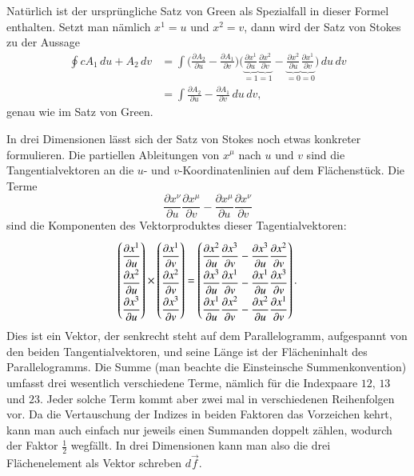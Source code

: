 Natürlich ist der ursprüngliche Satz von Green als Spezialfall in dieser
Formel enthalten.
Setzt man nämlich $x^1=u$ und $x^2=v$, dann wird der Satz von Stokes zu
der Aussage
\begin{align*}
\oint c A_1\,du + A_2\,dv
&=
\int
\biggl(
\frac{\partial A_2}{\partial u}-\frac{\partial A_1}{\partial v}
\biggr)
\biggl(
\underbrace{\frac{\partial x^1}{\partial u}}_{=1}
\underbrace{\frac{\partial x^2}{\partial v}}_{=1}
-
\underbrace{\frac{\partial x^2}{\partial u}}_{=0}
\underbrace{\frac{\partial x^1}{\partial v}}_{=0}
\biggr)
\,du\,dv
\\
&=
\int
\frac{\partial A_2}{\partial u}-\frac{\partial A_1}{\partial v}
\,du\,dv,
\end{align*}
genau wie im Satz von Green.

In drei Dimensionen lässt sich der Satz von Stokes noch etwas konkreter
formulieren.
Die partiellen Ableitungen von $x^\mu$ nach $u$ und $v$ sind die 
Tangentialvektoren an die $u$- und $v$-Koordinatenlinien auf dem 
Flächenstück.
Die Terme
\[
\frac{\partial x^\nu}{\partial u} \frac{\partial x^\mu}{\partial v}
-
\frac{\partial x^\mu}{\partial u} \frac{\partial x^\nu}{\partial v}
\]
sind die Komponenten des Vektorproduktes dieser Tagentialvektoren:
\[
\def\arraystretch{2.0}
\begin{pmatrix}
\displaystyle \frac{\partial x^1}{\partial u}\\
\displaystyle \frac{\partial x^2}{\partial u}\\
\displaystyle \frac{\partial x^3}{\partial u}
\end{pmatrix}
\times
\begin{pmatrix}
\displaystyle \frac{\partial x^1}{\partial v}\\
\displaystyle \frac{\partial x^2}{\partial v}\\
\displaystyle \frac{\partial x^3}{\partial v}
\end{pmatrix}
=
\begin{pmatrix}
\displaystyle
\frac{\partial x^2}{\partial u}\frac{\partial x^3}{\partial v}
-
\frac{\partial x^3}{\partial u}\frac{\partial x^2}{\partial v}
\\
\displaystyle
\frac{\partial x^3}{\partial u}\frac{\partial x^1}{\partial v}
-
\frac{\partial x^1}{\partial u}\frac{\partial x^3}{\partial v}
\\
\displaystyle
\frac{\partial x^1}{\partial u}\frac{\partial x^2}{\partial v}
-
\frac{\partial x^2}{\partial u}\frac{\partial x^1}{\partial v}
\end{pmatrix}.
\]
Dies ist ein Vektor, der senkrecht steht auf dem Parallelogramm,
aufgespannt von den beiden Tangentialvektoren, und seine Länge ist
der Flächeninhalt des Parallelogramms.
Die Summe (man beachte die Einsteinsche Summenkonvention) umfasst
drei wesentlich verschiedene Terme, nämlich für die Indexpaare
$12$, $13$ und $23$.
Jeder solche Term kommt aber zwei mal in verschiedenen Reihenfolgen
vor.
Da die Vertauschung der Indizes in beiden Faktoren das Vorzeichen 
kehrt, kann man auch einfach nur jeweils einen Summanden doppelt
zählen, wodurch der Faktor $\frac12$ wegfällt.
In drei Dimensionen kann man also die drei Flächenelement als Vektor
schreben $d\vec f$.


